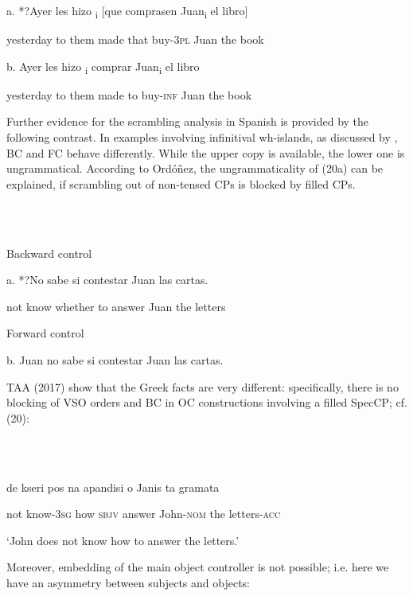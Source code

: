 \documentclass[output=paper]{langsci/langscibook}
\begin{document}
           a.   *?Ayer   les   hizo\textsubscript{ i}  [que comprasen Juan\textsubscript{i} el libro]

    yesterday to them made          that buy-\textsc{3pl} Juan the book

  b.   Ayer     les   hizo\textsubscript{ i} comprar   Juan\textsubscript{i}   el libro

    yesterday   to them made   to buy-\textsc{inf}   Juan   the book

Further evidence for the scrambling analysis in Spanish is provided by the following contrast. In examples involving infinitival wh-islands, as discussed by \citet{Torrego1996}, BC and FC behave differently. While the upper copy is available, the lower one is ungrammatical. According to Ordóñez, the ungrammaticality of (20a) can be explained, if scrambling out of non-tensed CPs is blocked by filled CPs.

\ea%
    \label{ex:key:20}
    \gll\\
        \\
    \glt
    \z

           Backward control

a.  *?No sabe   si   contestar Juan las cartas. 

    not   know whether to answer Juan the letters

  Forward control

  b.  Juan no sabe si contestar Juan las cartas.

TAA (2017) show that the Greek facts are very different: specifically, there is no blocking of VSO orders and BC in OC constructions involving a filled SpecCP; cf. (20):

\ea%
    \label{ex:key:21}
    \gll\\
        \\
    \glt
    \z

          de kseri          pos na apandisi     o Janis   ta gramata    

  not know{}-\textsc{3sg} how \textsc{sbjv} answer   John{}-\textsc{nom}   the letters{}-\textsc{acc}

  ‘John does not know how to answer the letters.’

Moreover, embedding of the main object controller is not possible; i.e. here we have an asymmetry between subjects and objects:

\ea%
    \label{ex:key:22}
    \gll\\
        \\
    \glt
    \z
\end{document}
